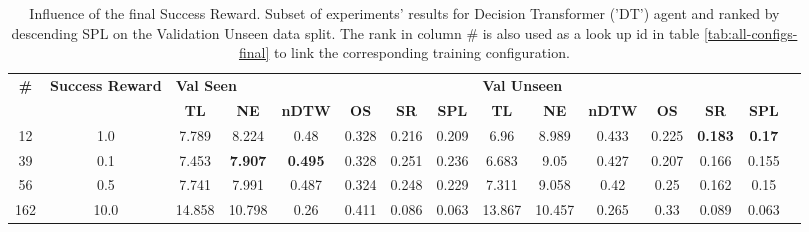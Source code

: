 \begin{table}
\centering
\caption{\label{tab:dt_reward_scale}Influence of the final Success Reward. Subset of experiments' results for Decision Transformer ('DT') agent and ranked by descending SPL on the Validation Unseen data split. The rank in column \# is also used as a look up id in table \ref{tab:all-configs-final} to link the corresponding training configuration.}
\begin{tabular}{@{\hskip3pt}c@{\hskip3pt}c@{\hskip3pt}c@{\hskip3pt}c@{\hskip3pt}c@{\hskip3pt}c@{\hskip3pt}c@{\hskip3pt}c@{\hskip3pt}c@{\hskip3pt}c@{\hskip3pt}c@{\hskip3pt}c@{\hskip3pt}c@{\hskip3pt}c@{\hskip3pt}c}
\toprule
\textbf{\#} & \textbf{Success Reward } & \multicolumn{6}{l}{\textbf{Val Seen}} & \multicolumn{6}{l}{\textbf{Val Unseen}} \\
 \textbf{~} &               \textbf{~} &       \textbf{TL} &     \textbf{NE} &   \textbf{nDTW} & \textbf{OS} & \textbf{SR} & \textbf{SPL} &         \textbf{TL} & \textbf{NE} & \textbf{nDTW} & \textbf{OS} &     \textbf{SR} &   \textbf{SPL} \\
\midrule
         12 &                      1.0 &             7.789 &           8.224 &            0.48 &       0.328 &       0.216 &        0.209 &                6.96 &       8.989 &         0.433 &       0.225 &  \textbf{0.183} &  \textbf{0.17} \\
         39 &                      0.1 &             7.453 &  \textbf{7.907} &  \textbf{0.495} &       0.328 &       0.251 &        0.236 &               6.683 &        9.05 &         0.427 &       0.207 &           0.166 &          0.155 \\
         56 &                      0.5 &             7.741 &           7.991 &           0.487 &       0.324 &       0.248 &        0.229 &               7.311 &       9.058 &          0.42 &        0.25 &           0.162 &           0.15 \\
        162 &                     10.0 &            14.858 &          10.798 &            0.26 &       0.411 &       0.086 &        0.063 &              13.867 &      10.457 &         0.265 &        0.33 &           0.089 &          0.063 \\
\bottomrule
\end{tabular}
\end{table}
